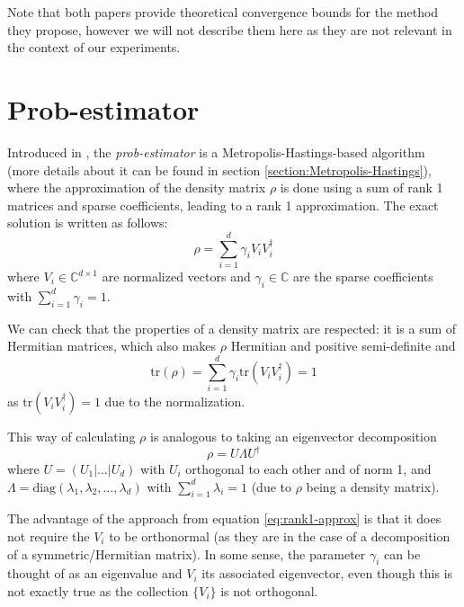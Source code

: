 \documentclass[12pt]{memoir}
\newcommand{\tr}{\text{tr}}
\begin{document}
Note that both papers provide theoretical convergence bounds for the method they propose, however we will not describe them here as they are not relevant in the context of our experiments.

\section{Prob-estimator}\label{section:prob-estimator}
Introduced in \cite{MA17}, the \textit{prob-estimator} is a Metropolis-Hastings-based algorithm (more details about it can be found in section \ref{section:Metropolis-Hastings}), where the approximation of the density matrix $\rho$ is done using a sum of rank 1 matrices and sparse coefficients, leading to a rank 1 approximation. The exact solution is written as follows:
\begin{equation}\label{eq:rank1-approx}
    \rho = \sum_{i=1}^d \gamma_i V_i V_i^\dagger
\end{equation}
where $V_i \in \mathbb{C}^{d\times 1}$ are normalized vectors and $\gamma_i \in \mathbb{C}$ are the sparse coefficients with $\sum_{i=1}^d \gamma_i = 1$.\medbreak

We can check that the properties of a density matrix are respected: it is a sum of Hermitian matrices, which also makes $\rho$ Hermitian and positive semi-definite and 
\begin{equation}
    \tr(\rho) = \sum_{i=1}^{d} \gamma_i \tr(V_i V_i^\dagger) = 1
\end{equation}
as $\tr(V_i V_i^\dagger) = 1$ due to the normalization.\medbreak

This way of calculating $\rho$ is analogous to taking an eigenvector decomposition
\begin{equation}
    \rho = U\Lambda U^\dagger
\end{equation}
where $U = (U_1|\dots|U_d)$ with $U_i$ orthogonal to each other and of norm 1, and $\Lambda = \text{diag}(\lambda_1, \lambda_2, \dots, \lambda_d)$ with $\sum_{i=1}^d \lambda_i = 1$ (due to $\rho$ being a density matrix).\medbreak

The advantage of the approach from equation \ref{eq:rank1-approx} is that it does not require the $V_i$ to be orthonormal (as they are in the case of a decomposition of a symmetric/Hermitian matrix). In some sense, the parameter $\gamma_i$ can be thought of as an eigenvalue and $V_i$ its associated eigenvector, even though this is not exactly true as the collection $\{V_i\}$ is not orthogonal. \medbreak
\end{document}
